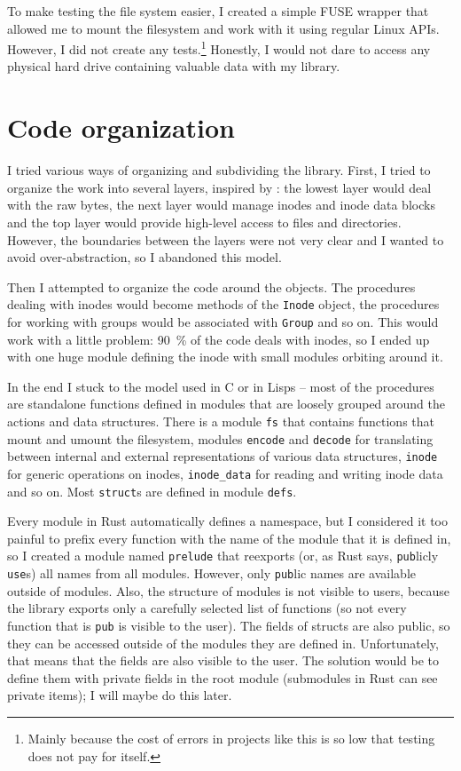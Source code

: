 To make testing the file system easier, I created a simple FUSE wrapper that
allowed me to mount the filesystem and work with it using regular Linux APIs.
However, I did not create any tests.\footnote{Mainly because the cost of errors
in projects like this is so low that testing does not pay for itself.} Honestly,
I would not dare to access any physical hard drive containing valuable data with
my library.

\section{Code organization}

I tried various ways of organizing and subdividing the library. First, I tried
to organize the work into several layers, inspired by \cite{sicp}: the lowest
layer would deal with the raw bytes, the next layer would manage inodes and
inode data blocks and the top layer would provide high-level access to files and
directories. However, the boundaries between the layers were not very clear and
I wanted to avoid over-abstraction, so I abandoned this model.

Then I attempted to organize the code around the objects. The procedures dealing
with inodes would become methods of the \texttt{Inode} object, the procedures
for working with groups would be associated with \texttt{Group} and so on. This
would work with a little problem: 90~\% of the code deals with inodes, so I
ended up with one huge module defining the inode with small modules orbiting
around it.

In the end I stuck to the model used in C or in Lisps -- most of the procedures
are standalone functions defined in modules that are loosely grouped around the
actions and data structures. There is a module \texttt{fs} that contains
functions that mount and umount the filesystem, modules \texttt{encode} and
\texttt{decode} for translating between internal and external representations of
various data structures, \texttt{inode} for generic operations on inodes,
\texttt{inode\_data} for reading and writing inode data and so on. Most
\texttt{struct}s are defined in module \texttt{defs}. 

Every module in Rust automatically defines a namespace, but I considered it too
painful to prefix every function with the name of the module that it is defined
in, so I created a module named \texttt{prelude} that reexports (or, as Rust
says, \texttt{pub}licly \texttt{use}s) all names from all modules. However, only
\texttt{pub}lic names are available outside of modules. Also, the structure of
modules is not visible to users, because the library exports only a carefully
selected list of functions (so not every function that is \texttt{pub} is
visible to the user). The fields of structs are also public, so they can be
accessed outside of the modules they are defined in. Unfortunately, that means
that the fields are also visible to the user. The solution would be to define
them with private fields in the root module (submodules in Rust can see private
items); I will maybe do this later.
